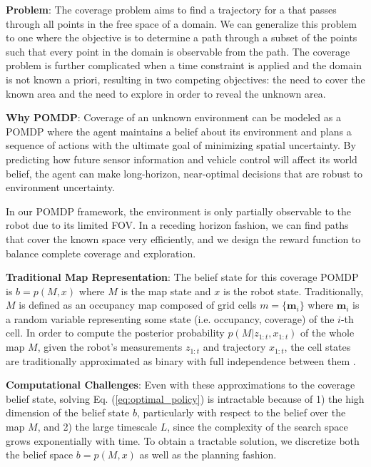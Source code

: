 \documentclass{article}
\newcommand{\ph}[1]{{\textbf{#1}:}} %
\begin{document}

\ph{Problem} The coverage problem aims to find a trajectory for a that passes through all points in the free space of a domain. We can generalize this problem to one where the objective is to determine a path through a subset of the points such that every point in the domain is observable from the path. The coverage problem is further complicated when a time constraint is applied and the domain is not known a priori, resulting in two competing objectives: the need to cover the known area and the need to explore in order to reveal the unknown area.

\ph{Why POMDP} Coverage of an unknown environment can be modeled as a POMDP where the agent maintains a belief about its environment and plans a sequence of actions with the ultimate goal of minimizing spatial uncertainty. By predicting how future sensor information and vehicle control will affect its world belief, the agent can make long-horizon, near-optimal decisions that are robust to environment uncertainty. 

In our POMDP framework, the environment is only partially observable to the robot due to its limited FOV. In a receding horizon fashion, we can find paths that cover the known space very efficiently, and we design the reward function to balance complete coverage and exploration.

\ph{Traditional Map Representation} The belief state for this coverage POMDP is $b = p(M, x)$ where $M$ is the map state and $x$ is the robot state. Traditionally, $M$ is defined as an occupancy map composed of grid cells  $m = \{\textbf{m}_i\}$ where $\mathbf{m}_i$ is a random variable representing some state (i.e. occupancy, coverage) of the $i$-th cell. In order to compute the posterior probability $p(M | z_{1:t}, x_{1:t})$ of the whole map $M$, given the robot's measurements $z_{1:t}$ and trajectory $x_{1:t}$, the cell states are traditionally approximated as binary with full independence between them \cite{TBF05,elfes1990stochastic}.

\ph{Computational Challenges} Even with these approximations to the coverage belief state, solving Eq. (\ref{eq:optimal_policy}) is intractable because of 1) the high dimension of the belief state $b$, particularly with respect to the belief over the map $M$, and 2) the large timescale $L$, since the complexity of the search space grows exponentially with time. To obtain a tractable solution, we discretize both the belief space $b=p(M,x)$ as well as the planning fashion. 
\end{document}
